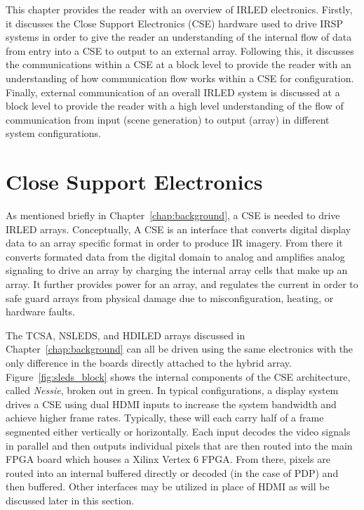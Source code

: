 \label{chap:system_overview}
This chapter provides the reader with an overview of IRLED electronics. Firstly, it discusses the Close Support Electronics (CSE)\cite{EjzakEtAl2015,HernandezEtAl2019,SinghEtAl2020} hardware used to drive IRSP systems in order to give the reader an understanding of the internal flow of data from entry into a CSE to output to an external array. Following this, it discusses the communications within a CSE at a block level to provide the reader with an understanding of how communication flow works within a CSE for configuration. Finally, external communication of an overall IRLED system is discussed at a block level to provide the reader with a high level understanding of the flow of communication from input (scene generation) to output (array) in different system configurations.

\section{Close Support Electronics}
    \label{sec:close_support_electronics}
    As mentioned briefly in Chapter~\ref{chap:background}, a CSE is needed to drive IRLED arrays. Conceptually, A CSE is an interface that converts digital display data to an array specific format in order to produce IR imagery. From there it converts formated data from the digital domain to analog and amplifies analog signaling to drive an array by charging the internal array cells that make up an array. It further provides power for an array, and regulates the current in order to safe guard arrays from physical damage due to misconfiguration, heating, or hardware faults.

    The TCSA, NSLEDS, and HDILED arrays discussed in Chapter~\ref{chap:background} can all be driven using the same electronics with the only difference in the boards directly attached to the hybrid array. Figure~\ref{fig:sleds_block} shows the internal components of the CSE architecture, called {\it Nessie}, broken out in green. In typical configurations, a display system drives a CSE using dual HDMI inputs to increase the system bandwidth and achieve higher frame rates. Typically, these will each carry half of a frame segmented either vertically or horizontally. Each input decodes the video signals in parallel and then outputs individual pixels that are then routed into the main FPGA board which houses a Xilinx Vertex 6 FPGA\cite{XILINX1}. From there, pixels are routed into an internal buffered directly or decoded (in the case of PDP) and then buffered. Other interfaces may be utilized in place of HDMI as will be discussed later in this section.

